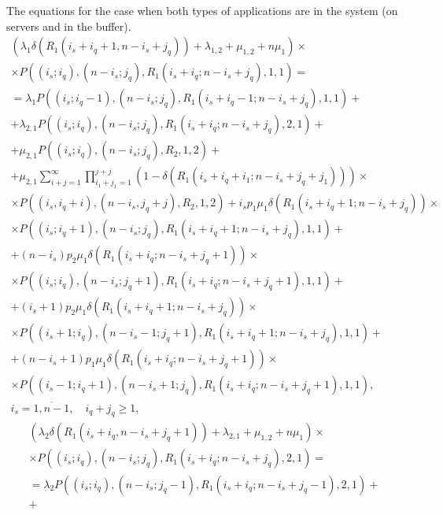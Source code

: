 \documentclass[default]{subfiles}
\begin{document}
{The equations for the case when both types of applications are in the
system (on servers and in the buffer).
\begin{multline}
  \left(\lambda_1 \delta\left(R_1(i_s+i_q+1,n-i_s+j_q)\right)+\lambda_{1,2}+\mu_{1,2}+n\mu_1\right) \times \\
  \times P\left((i_s;i_q),(n-i_s;j_q),R_1(i_s+i_q;
    n-i_s+j_q),1,1\right) = \\ = \lambda_1
  P\left((i_s;i_q-1),(n-i_s;j_q),R_1(i_s+i_q-1;n-i_s+j_q),1,1\right) +
  \\ + \lambda_{2,1} P\left((i_s;i_q),(n-i_s;j_q),R_1(i_s+i_q;
    n-i_s+j_q),2,1\right) + \\ + \mu_{2,1}
  P\left((i_s;i_q),(n-i_s;j_q),R_2,1,2\right) + \\ +
  \mu_{2,1} \sum\limits_{i+j=1}^{\infty}\prod\limits_{i_1+j_1=1}^{j+j}\left(1-\delta\left(R_1 (i_s+i_q+i_1;n-i_s+j_q+j_1) \right)\right) \times \\
  \times P\left((i_s,i_q+i),(n-i_s,j_q+j),R_2,1,2\right) +
  i_s p_1\mu_1\delta\left(R_1(i_s+i_q+1;n-i_s+j_q)\right) \times \\
  \times P\left((i_s;i_q+1),(n-i_s;j_q),R_1(i_s+i_q+1;
    n-i_s+j_q),1,1\right) + \\ +
  (n-i_s) p_2 \mu_1 \delta\left(R_1(i_s+i_q;n-i_s+j_q+1)\right) \times \\
  \times P\left((i_s;i_q),(n-i_s;j_q+1),R_1(i_s+i_q;
    n-i_s+j_q+1),1,1\right) + \\ +
  (i_s+1) p_2 \mu_1 \delta\left(R_1(i_s+i_q+1;n-i_s+j_q)\right)  \times \\
  \times P\left((i_s+1;i_q),(n-i_s-1;j_q+1),R_1(i_s+i_q+1;
    n-i_s+j_q),1,1\right) + \\ +
  (n-i_s+1) p_1\mu_1 \delta\left(R_1(i_s+i_q;n-i_s+j_q+1)\right) \times \\
  \times  P\left((i_s-1;i_q+1),(n-i_s+1;j_q),R_1(i_s+i_q; n-i_s+j_q+1),1,1\right), \\
  i_s=\overline{1,n-1}, \quad i_q+j_q\geqslant 1,
\label{eq:10.1}
\end{multline}
\begin{multline}
  \left(\lambda_2 \delta\left(R_1(i_s+i_q,n-i_s+j_q+1)\right)+\lambda_{2,1}+\mu_{1,2}+n\mu_1\right) \times \\
  \times  P\left((i_s;i_q),(n-i_s;j_q),R_1(i_s+i_q;
    n-i_s+j_q),2,1\right) = \\ =
  \lambda_2
  P\left((i_s;i_q),(n-i_s;j_q-1),R_1(i_s+i_q;n-i_s+j_q-1),2,1\right) +
  \\ +

\end{multline}}
\end{document}
